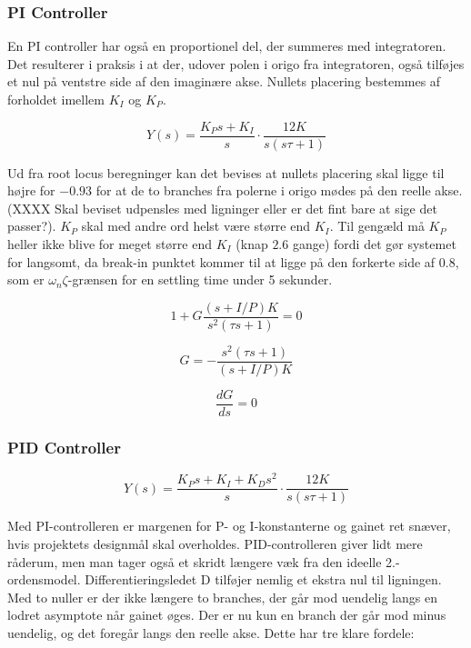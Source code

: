 \subsubsection{PI Controller}

En PI controller har også en proportionel del, der summeres med integratoren. Det resulterer i praksis i at der, udover polen i origo fra integratoren, også tilføjes et nul på ventstre side af den imaginære akse. Nullets placering bestemmes af forholdet imellem $K_{I}$ og $K_{P}$.

\begin{equation}\label{PI_OpenLoop}
Y(s)=\frac{K_{P}s+K_{I}}{s}\cdot\frac{12K}{s(s\tau+1)}
\end{equation}

Ud fra root locus beregninger kan det bevises at nullets placering skal ligge til højre for $-0.93$ for at de to branches fra polerne i origo mødes på den reelle akse. (XXXX Skal beviset udpensles med ligninger eller er det fint bare at sige det passer?). $K_{P}$ skal med andre ord helst være større end $K_{I}$. Til gengæld må $K_{P}$ heller ikke blive for meget større end $K_{I}$ (knap $2.6$ gange) fordi det gør systemet for langsomt, da break-in punktet kommer til at ligge på den forkerte side af $0.8$, som er $\omega_{n}\zeta$-grænsen for en settling time under 5 sekunder. 

\begin{equation}
1+G\frac{(s+I/P)K}{s^2(\tau s+1)}=0
\end{equation}

\begin{equation}
G=-\frac{s^2(\tau s+1)}{(s+I/P)K}
\end{equation}

\begin{equation}
\frac{dG}{ds}=0
\end{equation}

\subsubsection{PID Controller}

\begin{equation}\label{PID_OpenLoop}
Y(s)=\frac{K_{P}s+K_{I}+K_{D}s^2}{s}\cdot\frac{12K}{s(s\tau+1)}
\end{equation}

Med PI-controlleren er margenen for P- og I-konstanterne og gainet ret snæver, hvis projektets designmål skal overholdes. PID-controlleren giver lidt mere råderum, men man tager også et skridt længere væk fra den ideelle 2.-ordensmodel. Differentieringsledet D tilføjer nemlig et ekstra nul til ligningen. Med to nuller er der ikke længere to branches, der går mod uendelig langs en lodret asymptote når gainet øges. Der er nu kun en branch der går mod minus uendelig, og det foregår langs den reelle akse. Dette har tre klare fordele:

